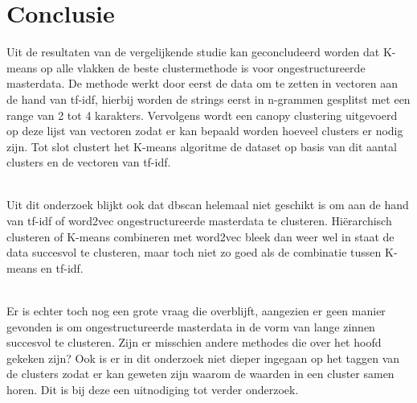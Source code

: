 
\chapter{Conclusie}%
\label{ch:conclusie}



Uit de resultaten van de vergelijkende studie kan geconcludeerd worden dat K-means op alle vlakken de beste clustermethode is voor ongestructureerde masterdata. De methode werkt door eerst de data om te zetten in vectoren aan de hand van tf-idf, hierbij worden de strings eerst in n-grammen gesplitst met een range van 2 tot 4 karakters. Vervolgens wordt een canopy clustering uitgevoerd op deze lijst van vectoren zodat er kan bepaald worden hoeveel clusters er nodig zijn. Tot slot clustert het K-means algoritme de dataset op basis van dit aantal clusters en de vectoren van tf-idf.
\\\indent

\\\indent
Uit dit onderzoek blijkt ook dat dbscan helemaal niet geschikt is om aan de hand van tf-idf of word2vec ongestructureerde masterdata te clusteren. Hiërarchisch clusteren of K-means combineren met word2vec bleek dan weer wel in staat de data succesvol te clusteren, maar toch niet zo goed als de combinatie tussen K-means en tf-idf.
\\\indent

\\\indent
Er is echter toch nog een grote vraag die overblijft, aangezien er geen manier gevonden is om ongestructureerde masterdata in de vorm van lange zinnen succesvol te clusteren. Zijn er misschien andere methodes die over het hoofd gekeken zijn? Ook is er in dit onderzoek niet dieper ingegaan op het taggen van de clusters zodat er kan geweten zijn waarom de waarden in een cluster samen horen. Dit is bij deze een uitnodiging tot verder onderzoek.

